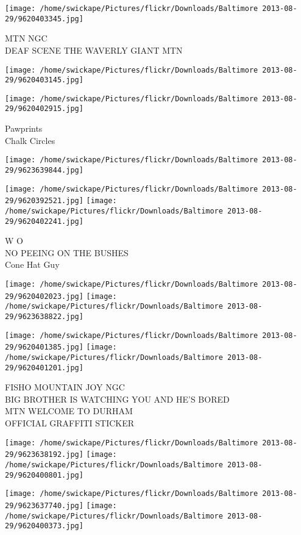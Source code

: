 \documentclass[10pt,letterpaper]{article}
\begin{document}
\vspace{0.25in}
\texttt{[image: /home/swickape/Pictures/flickr/Downloads/Baltimore 2013-08-29/9620403345.jpg]}

MTN NGC\\
DEAF SCENE THE WAVERLY GIANT MTN
\pagebreak

\texttt{[image: /home/swickape/Pictures/flickr/Downloads/Baltimore 2013-08-29/9620403145.jpg]}

\vspace{0.25in}
\texttt{[image: /home/swickape/Pictures/flickr/Downloads/Baltimore 2013-08-29/9620402915.jpg]}

Pawprints\\
Chalk Circles
\pagebreak

\texttt{[image: /home/swickape/Pictures/flickr/Downloads/Baltimore 2013-08-29/9623639844.jpg]}

\vspace{0.25in}
\texttt{[image: /home/swickape/Pictures/flickr/Downloads/Baltimore 2013-08-29/9620392521.jpg]}
\texttt{[image: /home/swickape/Pictures/flickr/Downloads/Baltimore 2013-08-29/9620402241.jpg]}

W O\\
NO PEEING ON THE BUSHES\\
Cone Hat Guy
\pagebreak

\texttt{[image: /home/swickape/Pictures/flickr/Downloads/Baltimore 2013-08-29/9620402023.jpg]}
\texttt{[image: /home/swickape/Pictures/flickr/Downloads/Baltimore 2013-08-29/9623638822.jpg]}

\texttt{[image: /home/swickape/Pictures/flickr/Downloads/Baltimore 2013-08-29/9620401385.jpg]}
\texttt{[image: /home/swickape/Pictures/flickr/Downloads/Baltimore 2013-08-29/9620401201.jpg]}

FISHO MOUNTAIN JOY NGC\\
BIG BROTHER IS WATCHING YOU AND HE'S BORED\\
MTN WELCOME TO DURHAM\\
OFFICIAL GRAFFITI STICKER
\pagebreak

\texttt{[image: /home/swickape/Pictures/flickr/Downloads/Baltimore 2013-08-29/9623638192.jpg]}
\texttt{[image: /home/swickape/Pictures/flickr/Downloads/Baltimore 2013-08-29/9620400801.jpg]}

\texttt{[image: /home/swickape/Pictures/flickr/Downloads/Baltimore 2013-08-29/9623637740.jpg]}
\texttt{[image: /home/swickape/Pictures/flickr/Downloads/Baltimore 2013-08-29/9620400373.jpg]}
\end{document}
